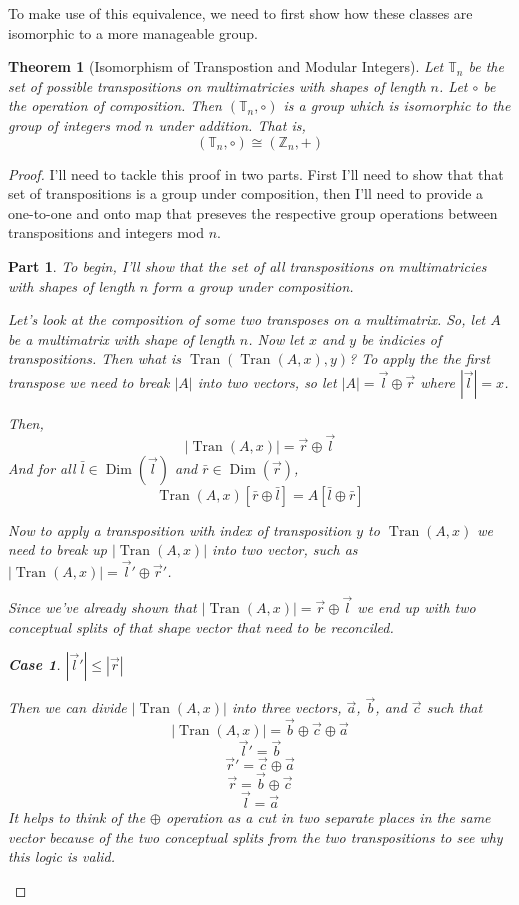 \documentclass[12pt]{book}
\theoremstyle{definition}
\theoremstyle{plain}
\newtheorem{theorem}{Theorem}[chapter]
\theoremstyle{ppart}
\newtheorem{ppart}{Part}
\theoremstyle{case}
\newtheorem{case}{Case}
\theoremstyle{solution}
\DeclareMathOperator{\Dim}{Dim}
\DeclareMathOperator{\Tran}{Tran}
\begin{document}
To make use of this equivalence, we need to first show how these classes are
isomorphic \cite{book:abstract} to a more manageable group.

\begin{theorem}[Isomorphism of Transpostion and Modular Integers]
\label{tran_int_iso}
Let $\mathbb{T}_n$ be the set of possible transpositions on multimatricies with
shapes of length $n$. Let $\circ$ be the operation of composition. Then
$(\mathbb{T}_n, \circ)$ is a group which is isomorphic to the group of
integers mod $n$ under addition. That is,
\[ (\mathbb{T}_n, \circ) \cong (\mathbb{Z}_n, +) \]
\end{theorem}
\begin{proof}
I'll need to tackle this proof in two parts. First I'll need to show that
that set of transpositions is a group under composition, then I'll need to
provide a one-to-one and onto map that preseves the respective group operations
between transpositions and integers mod $n$.

\begin{ppart}
To begin, I'll show that the set of all transpositions on multimatricies 
with shapes of length $n$ form a group under composition.

Let's look at the composition of some two transposes on a multimatrix.
So, let $A$ be a multimatrix with shape of length $n$. Now let $x$ and $y$
be indicies of transpositions. Then what is $\Tran(\Tran(A, x), y)$?
To apply the the first transpose we need to break $|A|$ into two vectors,
so let $|A| = \vec{l} \oplus \vec{r}$ where $|\vec{l}| = x$.

Then,
\[ |\Tran(A, x)| = \vec{r} \oplus \vec{l} \]
And for all
$\bar{l} \in \Dim(\vec{l})$ and $\bar{r} \in \Dim(\vec{r})$,
\[ \Tran(A, x)[\bar{r} \oplus \bar{l}] = A[\bar{l} \oplus \bar{r}] \]

Now to apply a transposition with index of transposition $y$ to $\Tran(A,x)$
we need to break up $|\Tran(A,x)|$ into two vector, such as
$|\Tran(A,x)| = \vec{l}' \oplus \vec{r}'$.

Since we've already shown that $|\Tran(A,x)| = \vec{r} \oplus \vec{l}$
we end up with two conceptual splits of that shape vector that need to
be reconciled.

\begin{case} $|\vec{l}'| \le |\vec{r}|$

Then we can divide $|\Tran(A,x)|$ into three vectors, $\vec{a}$, $\vec{b}$, and $\vec{c}$
such that
\[ |\Tran(A,x)| = \vec{b} \oplus \vec{c} \oplus \vec{a} \]
\[ \vec{l}' = \vec{b} \]
\[ \vec{r}' = \vec{c} \oplus \vec{a} \]
\[ \vec{r} = \vec{b} \oplus \vec{c} \]
\[ \vec{l} = \vec{a} \]
It helps to think of the $\oplus$ operation as a cut in two separate places in the same
vector because of the two conceptual splits from the two transpositions to see why this
logic is valid.


\end{case}
\end{ppart}
\end{proof}
\end{document}
